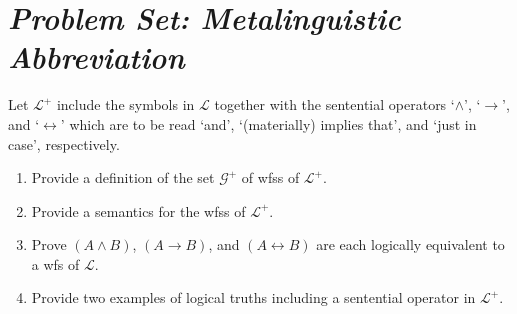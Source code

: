 \documentclass[a4paper, 11pt]{article} %
\begin{document}
\section*{\it Problem Set: Metalinguistic Abbreviation}

Let $\mathcal{L}^+$ include the symbols in $\mathcal{L}$ together with the sentential operators `$\wedge$', `$\rightarrow$', and `$\leftrightarrow$' which are to be read `and', `(materially) implies that', and `just in case', respectively.
\begin{enumerate}[leftmargin=.32in,labelsep=.15in,label=(\arabic*)]\small
\item Provide a definition of the set $\mathcal{G}^+$ of wfss of $\mathcal{L}^+$.
\item Provide a semantics for the wfss of $\mathcal{L}^+$.
\item Prove $(A\wedge B)$, $(A\rightarrow B)$, and $(A\leftrightarrow B)$ are each logically equivalent to a wfs of $\mathcal{L}$.
\item Provide two examples of logical truths including a sentential operator in $\mathcal{L}^+$. 
\end{enumerate}




\end{document}
